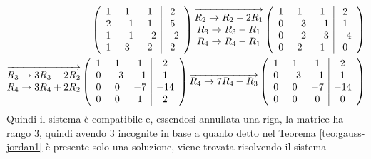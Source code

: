 \documentclass{book}
\theoremstyle{definition}
\theoremstyle{plain}
\begin{document}
\begin{eqnarray*}
  \left(
  \begin{array}[ht!]{ccc|c}
    1 & 1 & 1 & 2\\
    2 & -1 & 1 & 5\\
    1 & -1 & -2 & -2\\
    1 & 3 & 2 & 2
  \end{array}\right)
  \overrightarrow{
  \begin{matrix}
    R_2\to R_2-2R_1\\
    R_3\to R_3-R_1\\
    R_4\to R_4-R_1
  \end{matrix}
  }\left(
  \begin{array}[ht!]{ccc|c}
    1 & 1 & 1 & 2\\
    0 & -3 & -1 & 1\\
    0 & -2 & -3 & -4\\
    0 & 2 & 1 & 0
  \end{array}\right)\\ \overrightarrow{
  \begin{matrix}
    R_3\to 3R_3-2R_2\\
    R_4\to 3R_4+2R_2
  \end{matrix}
  }\left(
  \begin{array}[ht!]{ccc|c}
    1 & 1 & 1 & 2\\
    0 & -3 & -1 & 1\\
    0 & 0 & -7 & -14\\
    0 & 0 & 1 & 2
  \end{array}\right)\overrightarrow{R_4\to7R_4+R_3}
  \left(
  \begin{array}[ht!]{ccc|c}
    1 & 1 & 1 & 2\\
    0 & -3 & -1 & 1\\
    0 & 0 & -7 & -14\\
    0 & 0 & 0 & 0
  \end{array}
  \right)
\end{eqnarray*}
Quindi il sistema è compatibile e, essendosi annullata una riga, la matrice
ha rango 3, quindi avendo 3 incognite in base a quanto detto nel Teorema \ref{teo:gauss-jordan1}
è presente solo una soluzione, viene trovata risolvendo il sistema 
\end{document}
